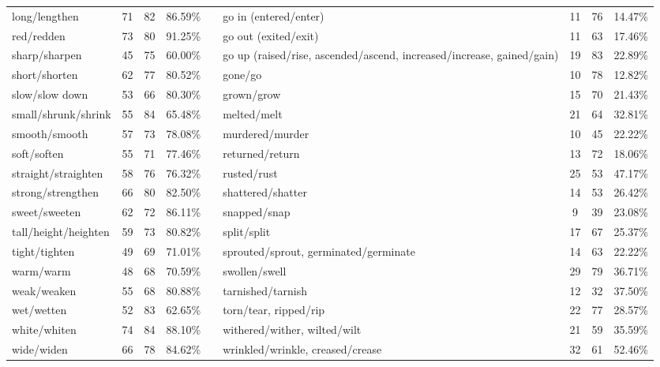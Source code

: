 \begin{tabular}{p{3cm}ccccp{3cm}ccc}
long/lengthen & 71 & 82 & 86.59\% & & go in (entered/enter) & 11 & 76 & 14.47\% \\
red/redden & 73 & 80 & 91.25\% & & go out (exited/exit) & 11 & 63 & 17.46\% \\
sharp/sharpen & 45 & 75 & 60.00\% & & go up (raised/rise, ascended/ascend, increased/increase, gained/gain) & 19 & 83 & 22.89\% \\
short/shorten & 62 & 77 & 80.52\% & & gone/go & 10 & 78 & 12.82\% \\
slow/slow down & 53 & 66 & 80.30\% & & grown/grow & 15 & 70 & 21.43\% \\
small/shrunk/shrink & 55 & 84 & 65.48\% & & melted/melt & 21 & 64 & 32.81\% \\
smooth/smooth & 57 & 73 & 78.08\% & & murdered/murder & 10 & 45 & 22.22\% \\
soft/soften & 55 & 71 & 77.46\% & & returned/return & 13 & 72 & 18.06\% \\
straight/straighten & 58 & 76 & 76.32\% & & rusted/rust & 25 & 53 & 47.17\% \\
strong/strengthen & 66 & 80 & 82.50\% & & shattered/shatter & 14 & 53 & 26.42\% \\
sweet/sweeten & 62 & 72 & 86.11\% & & snapped/snap & 9 & 39 & 23.08\% \\
tall/height/heighten & 59 & 73 & 80.82\% & & split/split & 17 & 67 & 25.37\% \\
tight/tighten & 49 & 69 & 71.01\% & & sprouted/sprout, germinated/germinate & 14 & 63 & 22.22\% \\
warm/warm & 48 & 68 & 70.59\% & & swollen/swell & 29 & 79 & 36.71\% \\
weak/weaken & 55 & 68 & 80.88\% & & tarnished/tarnish & 12 & 32 & 37.50\% \\
wet/wetten & 52 & 83 & 62.65\% & & torn/tear, ripped/rip & 22 & 77 & 28.57\% \\
white/whiten & 74 & 84 & 88.10\% & & withered/wither, wilted/wilt & 21 & 59 & 35.59\% \\
wide/widen & 66 & 78 & 84.62\% & & wrinkled/wrinkle, creased/crease & 32 & 61 & 52.46\%
\end{tabular}